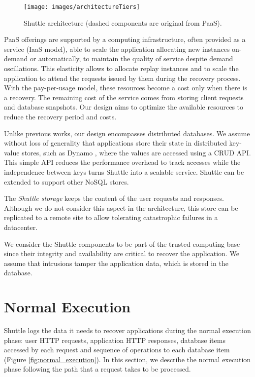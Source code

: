 \documentclass[10pt,conference]{IEEEtran}
\begin{document}
\begin{figure}
  \centering
  \texttt{[image: images/architectureTiers]}
  \caption{Shuttle architecture (dashed components are original from \ac{PaaS}).   }
  \label{fig:shuttle_architecture}
\end{figure}

PaaS offerings are supported by a computing infrastructure, often provided as a service (IaaS model), able to scale the application allocating new instances on-demand or automatically, to maintain the quality of service despite demand oscillations. This elasticity  allows to allocate replay instances and to scale the application to attend the requests issued by them during the recovery process.
With the pay-per-usage model, these resources become a cost only when there is a recovery. The remaining cost of the service comes from storing client requests and database snapshots. Our design aims to optimize the available resources to reduce the recovery period and costs. 


Unlike previous works, our design encompasses distributed databases. We assume without loss of generality that applications store their state in distributed key-value stores, such as Dynamo \cite{Decandia2007}, where the values are accessed using a \acf{CRUD} API. This simple API reduces the performance overhead to track accesses while the independence between keys turns Shuttle into a scalable service. Shuttle can be extended to support other NoSQL stores.

The \emph{Shuttle storage} keeps the content of the user requests and responses. Although we do not consider this aspect in the architecture, this store can be replicated to a remote site to allow tolerating catastrophic failures in a datacenter.

We consider the Shuttle components to be part of the trusted computing base since their integrity and availability are critical to recover the application. We assume that intrusions tamper the application data, which is stored in the database.





\section{Normal Execution}
\label{sec:architecture:normal_execution}

Shuttle logs the data it needs to recover applications during the normal execution phase: user HTTP requests, application HTTP responses, database items accessed by each request and sequence of operations to each database item (Figure \ref{fig:normal_execution}). In this section, we describe the normal execution phase following the path that a request takes to be processed.
\end{document}
